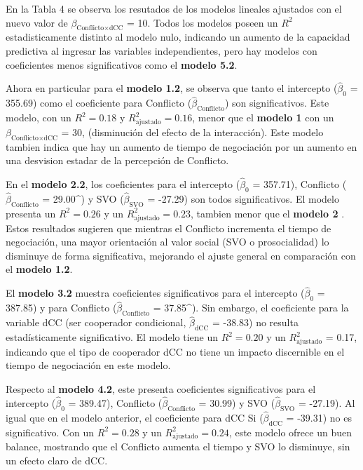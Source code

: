 \documentclass[
  spanish,
  10pt,
]{article}
\begin{document}
En la Tabla 4 se observa los resutados de los modelos lineales ajustados
con el nuevo valor de \(\beta_{\text{Conflicto} \times \text{dCC}}\) =
10. Todos los modelos poseen un \(R^2\) estadisticamente distinto al
modelo nulo, indicando un aumento de la capacidad predictiva al ingresar
las variables independientes, pero hay modelos con coeficientes menos
significativos como el \textbf{modelo 5.2}.

Ahora en particular para el \textbf{modelo 1.2}, se observa que tanto el
intercepto (\(\hat{\beta}_{0}\) = 355.69) como el coeficiente para
Conflicto (\(\hat{\beta}_{\text{Conflicto}}\)) son significativos. Este
modelo, con un \(R^2 = 0.18\) y \(R^2_{\text{ajustado}} = 0.16\), menor
que el \textbf{modelo 1} con un
\(\beta_{\text{Conflicto} \times \text{dCC}}\) = 30, (disminución del
efecto de la interacción). Este modelo tambien indica que hay un aumento
de tiempo de negociación por un aumento en una desvision estadar de la
percepción de Conflicto.

En el \textbf{modelo 2.2}, los coeficientes para el intercepto
(\(\hat{\beta}_{0}\) = 357.71), Conflicto
(\(\hat{\beta}_{\text{Conflicto}}\) = 29.00\^{}) y SVO
(\(\hat{\beta}_{\text{SVO}}\) = -27.29) son todos significativos. El
modelo presenta un \(R^2 = 0.26\) y un \(R^2_{\text{ajustado}} = 0.23\),
tambien menor que el \textbf{modelo 2} . Estos resultados sugieren que
mientras el Conflicto incrementa el tiempo de negociación, una mayor
orientación al valor social (SVO o prosocialidad) lo disminuye de forma
significativa, mejorando el ajuste general en comparación con el
\textbf{modelo 1.2}.

El \textbf{modelo 3.2} muestra coeficientes significativos para el
intercepto (\(\hat{\beta}_{0}\) = 387.85) y para Conflicto
(\(\hat{\beta}_{\text{Conflicto}}\) = 37.85\^{}). Sin embargo, el
coeficiente para la variable dCC (ser cooperador condicional,
\(\hat{\beta}_{\text{dCC}}\) = -38.83) no resulta estadísticamente
significativo. El modelo tiene un \(R^2 = 0.20\) y un
\(R^2_{\text{ajustado}}\) = 0.17, indicando que el tipo de cooperador
dCC no tiene un impacto discernible en el tiempo de negociación en este
modelo.

Respecto al \textbf{modelo 4.2}, este presenta coeficientes
significativos para el intercepto (\(\hat{\beta}_{0}\) = 389.47),
Conflicto (\(\hat{\beta}_{\text{Conflicto}}\) = 30.99) y SVO
(\(\hat{\beta}_{\text{SVO}}\) = -27.19). Al igual que en el modelo
anterior, el coeficiente para dCC Si (\(\hat{\beta}_{\text{dCC}}\) =
-39.31) no es significativo. Con un \(R^2 = 0.28\) y un
\(R^2_{\text{ajustado}} = 0.24\), este modelo ofrece un buen balance,
mostrando que el Conflicto aumenta el tiempo y SVO lo disminuye, sin un
efecto claro de dCC.
\end{document}
